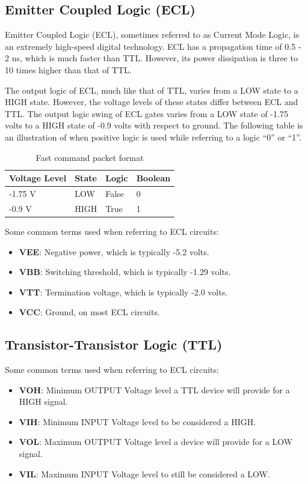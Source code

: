\subsection{Emitter Coupled Logic (ECL)}\label{sec:emitt-coupl-logic}
Emitter Coupled Logic (ECL), sometimes referred to as Current Mode Logic, is an
extremely high-speed digital technology. ECL has a propagation time of 0.5 - 2
ns, which is much faster than TTL. However, its power dissipation is three to 10
times higher than that of TTL.

The output logic of ECL, much like that of TTL, varies from a LOW state to a
HIGH state. However, the voltage levels of these states differ between ECL and
TTL. The output logic swing of ECL gates varies from a LOW state of -1.75 volts
to a HIGH state of -0.9 volts with respect to ground. The following table is an
illustration of when positive logic is used while referring to a logic ``0'' or
``1''.
\begin{table}[H]
  \centering
  \begin{tabular}{l l l l}
    \hline
    \textbf{Voltage Level} & \textbf{State} & \textbf{Logic} & \textbf{Boolean}
    \\
    \hline
    -1.75 V & LOW & False & 0 \\
    -0.9 V & HIGH & True & 1 \\
    \hline
  \end{tabular}
  \caption{Fast command packet format}
\end{table}

Some common terms used when referring to ECL circuits:
\begin{itemize}
\item \textbf{VEE}: Negative power, which is typically -5.2 volts.
\item \textbf{VBB}: Switching threshold, which is typically -1.29 volts.
\item \textbf{VTT}: Termination voltage, which is typically -2.0 volts.
\item \textbf{VCC}: Ground, on most ECL circuits.
\end{itemize}

\subsection{Transistor-Transistor Logic (TTL)}

Some common terms used when referring to ECL circuits:
\begin{itemize}
\item \textbf{VOH}: Minimum OUTPUT Voltage level a TTL device will provide for a
  HIGH signal.
\item \textbf{VIH}: Minimum INPUT Voltage level to be considered a HIGH.
\item \textbf{VOL}: Maximum OUTPUT Voltage level a device will provide for a LOW
  signal.
\item \textbf{VIL}: Maximum INPUT Voltage level to still be considered a LOW.
\end{itemize}

